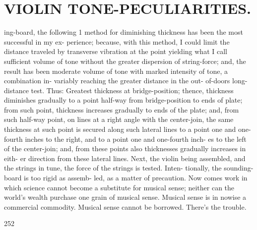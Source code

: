 \documentclass{article}
\begin{document}
\section*{VIOLIN TONE-PECULIARITIES.}
ing-board, the following 1 method for diminishing thickness has been the most successful in my ex- perience; because, with this method, I could limit the distance traveled by transverse vibration at the point yielding what I call sufficient volume of tone without the greater dispersion of string-force; and, the result has been moderate volume of tone with marked intensity of tone, a combination in- variably reaching the greater distance in the out- of-doors long-distance test. Thus: Greatest thickness at bridge-position; thence, thickness diminishes gradually to a point half-way from bridge-position to ends of plate; from such point, thickness increases gradually to ends of the plate; and, from such half-way point, on lines at a right angle with the center-join, the same thickness at such point is secured along such lateral lines to a point one and one-fourth inches to the right, and to a point one and one-fourth inch- es to the left of the center-join; and, from these points also thicknesses gradually increases in eith- er direction from these lateral lines. Next, the violin being assembled, and the strings in tune, the force of the strings is tested. Inten- tionally, the sounding-board is too rigid as assemb- led, as a matter of precaution. Now comes work in which science cannot become a substitute for musical sense; neither can the world's wealth purchase one grain of musical sense. Musical sense is in nowise a commercial commodity. Musical sense cannot be borrowed. There's the trouble.

252
\end{document}
